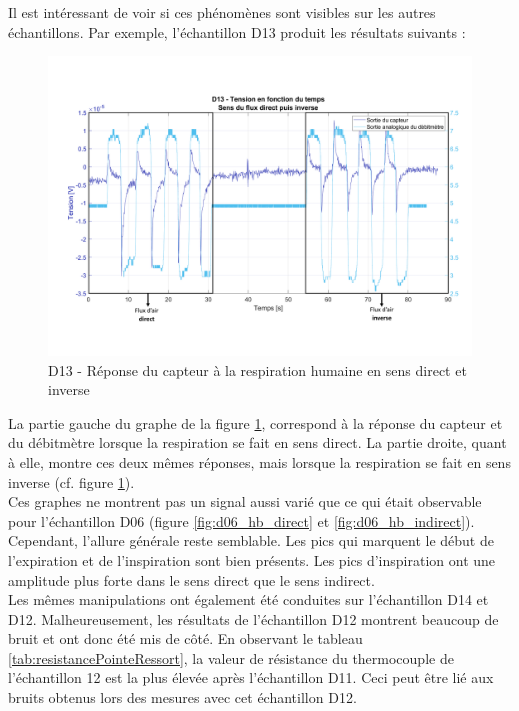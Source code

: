 Il est intéressant de voir si ces phénomènes sont visibles sur les autres échantillons. Par exemple, l'échantillon D13 produit les résultats suivants :
\begin{figure}[H]
    \centering
    \includegraphics[scale = 0.5]{assets/figures/D13_human_breath_direct_invert_blue.pdf}
    \caption{D13 - Réponse du capteur à la respiration humaine en sens direct et inverse}
    \label{fig:D13_human_breath_direct_invert}
\end{figure}

La partie gauche du graphe de la figure \ref{fig:D13_human_breath_direct_invert}, correspond à la réponse du capteur et du débitmètre lorsque la 
respiration se fait en sens direct. La partie droite, quant à elle, montre ces deux mêmes réponses, mais lorsque la respiration se fait en sens 
inverse (cf. figure \ref{fig:D13_human_breath_direct_invert}). \\
Ces graphes ne montrent pas un signal aussi varié que ce qui était observable pour l'échantillon D06 (figure 
\ref{fig:d06_hb_direct} et \ref{fig:d06_hb_indirect}). Cependant, l'allure générale reste semblable. Les pics qui marquent le début de l'expiration 
et de l'inspiration sont bien présents. Les pics d'inspiration ont une amplitude plus forte dans le sens direct que le sens indirect. \\

Les mêmes manipulations ont également été conduites sur l'échantillon D14 et D12. Malheureusement, les résultats de l'échantillon D12 montrent 
beaucoup de bruit et ont donc été mis de côté. En observant le tableau \ref{tab:resistancePointeRessort}, la valeur de résistance du thermocouple 
de l'échantillon 12 est la plus élevée après l'échantillon D11. Ceci peut être lié aux bruits obtenus lors des mesures avec cet échantillon D12. \\

